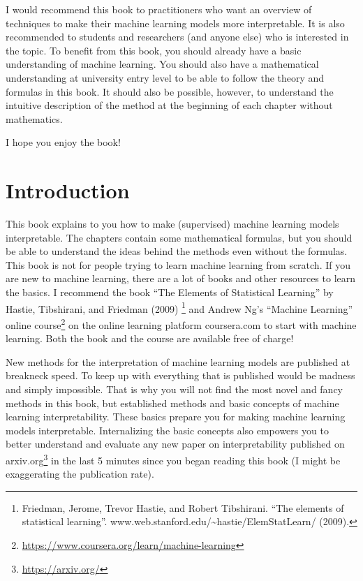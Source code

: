 \documentclass[
  10pt,
]{scrbook}
\renewcommand{\href}[2]{#2\footnote{\url{#1}}}
\begin{document}
I would recommend this book to practitioners who want an overview of techniques to make their machine learning models more interpretable.
It is also recommended to students and researchers (and anyone else) who is interested in the topic.
To benefit from this book, you should already have a basic understanding of machine learning.
You should also have a mathematical understanding at university entry level to be able to follow the theory and formulas in this book.
It should also be possible, however, to understand the intuitive description of the method at the beginning of each chapter without mathematics.

I hope you enjoy the book!

\mainmatter

\hypertarget{intro}{%
\chapter{Introduction}\label{intro}}

This book explains to you how to make (supervised) machine learning models interpretable.
The chapters contain some mathematical formulas, but you should be able to understand the ideas behind the methods even without the formulas.
This book is not for people trying to learn machine learning from scratch.
If you are new to machine learning, there are a lot of books and other resources to learn the basics.
I recommend the book ``The Elements of Statistical Learning'' by Hastie, Tibshirani, and Friedman (2009) \footnote{Friedman, Jerome, Trevor Hastie, and Robert Tibshirani. ``The elements of statistical learning''. www.web.stanford.edu/\textasciitilde hastie/ElemStatLearn/ (2009).} and \href{https://www.coursera.org/learn/machine-learning}{Andrew Ng's ``Machine Learning'' online course} on the online learning platform coursera.com to start with machine learning.
Both the book and the course are available free of charge!

New methods for the interpretation of machine learning models are published at breakneck speed.
To keep up with everything that is published would be madness and simply impossible.
That is why you will not find the most novel and fancy methods in this book, but established methods and basic concepts of machine learning interpretability.
These basics prepare you for making machine learning models interpretable.
Internalizing the basic concepts also empowers you to better understand and evaluate any new paper on interpretability published on \href{https://arxiv.org/}{arxiv.org} in the last 5 minutes since you began reading this book (I might be exaggerating the publication rate).
\end{document}
